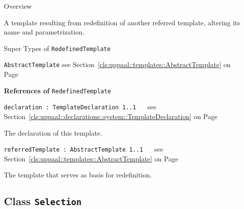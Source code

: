 	\begin{longdescription}
		\item[Overview] 		
				

	

		A template resulting from redefinition of another referred template, altering its name and parametrization.		
		\item[Super Types of \texttt{RedefinedTemplate}] ~
			\begin{longdescription}
				\item[\texttt{AbstractTemplate}] see Section~\ref{cls:uppaal::templates::AbstractTemplate} on Page~\pageref{cls:uppaal::templates::AbstractTemplate}						\end{longdescription}
		
	
			\item[\textbf{References of} \texttt{RedefinedTemplate}] ~
			\begin{longdescription}
	\item[\texttt{declaration : TemplateDeclaration 	\symbol{"5B}1..1\symbol{"5D}
}] ~
	see Section~\ref{cls:uppaal::declarations::system::TemplateDeclaration} on Page~\pageref{cls:uppaal::declarations::system::TemplateDeclaration}
	
	\nopagebreak
		
				

	

		The declaration of this template.		
	\item[\texttt{referredTemplate : AbstractTemplate 	\symbol{"5B}1..1\symbol{"5D}
}] ~
	see Section~\ref{cls:uppaal::templates::AbstractTemplate} on Page~\pageref{cls:uppaal::templates::AbstractTemplate}
	
	\nopagebreak
		
				

	

		The template that serves as basis for redefinition.		
			\end{longdescription}
	
	\end{longdescription}
	

\subsection{Class \bfseries \texttt{Selection}\normalfont}
\label{cls:uppaal::templates::Selection} 
	
